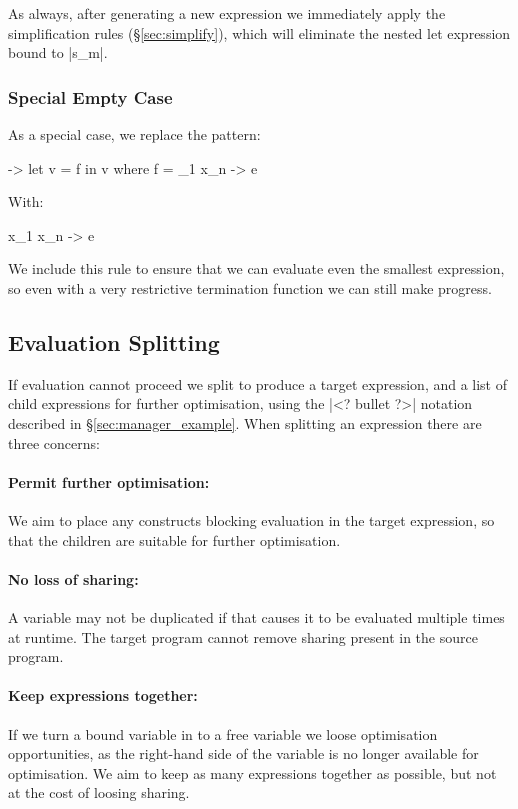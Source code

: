 \documentclass[draft]{sigplanconf}
\begin{document}
As always, after generating a new expression we immediately apply the simplification rules (\S\ref{sec:simplify}), which will eliminate the nested let expression bound to |s_m|.

\subsubsection{Special Empty Case}

As a special case, we replace the pattern:

\begin{code}
\free ->  let  v = f
          in   v
where f = \x_1 x_n -> e
\end{code}

With:

\begin{code}
\free x_1 x_n -> e
\end{code}

We include this rule to ensure that we can evaluate even the smallest expression, so even with a very restrictive termination function we can still make progress.

\subsection{Evaluation Splitting}
\label{sec:eval_split}

If evaluation cannot proceed we split to produce a target expression, and a list of child expressions for further optimisation, using the |<? bullet ?>| notation described in \S\ref{sec:manager_example}. When splitting an expression there are three concerns:

\paragraph{Permit further optimisation:} We aim to place any constructs blocking evaluation in the target expression, so that the children are suitable for further optimisation.

\paragraph{No loss of sharing:} A variable may not be duplicated if that causes it to be evaluated multiple times at runtime. The target program cannot remove sharing present in the source program.

\paragraph{Keep expressions together:} If we turn a bound variable in to a free variable we loose optimisation opportunities, as the right-hand side of the variable is no longer available for optimisation. We aim to keep as many expressions together as possible, but not at the cost of loosing sharing.
\end{document}
